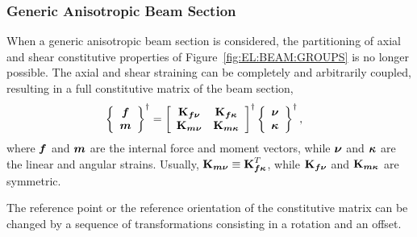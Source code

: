 \subsubsection{Generic Anisotropic Beam Section}
When a generic anisotropic beam section is considered,
the partitioning of axial and shear constitutive properties
of Figure~\ref{fig:EL:BEAM:GROUPS} is no longer possible.
The axial and shear straining can be completely and arbitrarily coupled,
resulting in a full constitutive matrix of the beam section,
\begin{align}
	\cubr{\cvvect{
		\T{f} \\
		\T{m}
	}}^\dagger
	&=
	\sqbr{\matr{cc}{
		\TT{K}_{\T{f}\T{\nu}} & \TT{K}_{\T{f}\T{\kappa}} \\
		\TT{K}_{\T{m}\T{\nu}} & \TT{K}_{\T{m}\T{\kappa}}
	}}^\dagger
	\cubr{\cvvect{
		\T{\nu} \\
		\T{\kappa}
	}}^\dagger ,
\end{align}
where $\T{f}$ and $\T{m}$ are the internal force and moment vectors,
while $\T{\nu}$ and $\T{\kappa}$ are the linear and angular strains.
Usually, $\TT{K}_{\T{m}\T{\nu}}\equiv\TT{K}_{\T{f}\T{\kappa}}^T$,
while $\TT{K}_{\T{f}\T{\nu}}$ and $\TT{K}_{\T{m}\T{\kappa}}$ are symmetric.


The reference point or the reference orientation of the constitutive
matrix can be changed by a sequence of transformations consisting
in a rotation and an offset.

